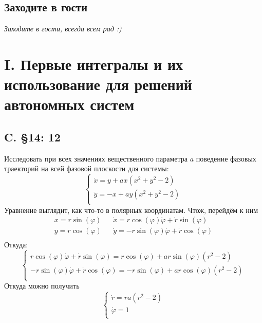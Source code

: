 \documentclass{article}
\begin{document}
\subsection{Заходите в гости}
 \textcolor[rgb]{0.480469,0.566406,0.480469}{\textit{Заходите в гости, всегда всем рад :)}}                                                                                              

\section{I. Первые интегралы и их использование для решений автономных систем}
\subsection{C. \S14: 12}
Исследовать при всех значениях вещественного параметра $a$ поведение фазовых траекторий на всей фазовой плоскости для системы:
\begin{equation}
    \begin{cases}
       \dot{x} = y + ax(x^2 + y^2 - 2)\\
        \dot{y} = - x + ay(x^2 + y^2 - 2)\\
    \end{cases}
\end{equation}
Уравнение выглядит, как что-то в полярных координатам. Чтож, перейдём к ним 
\begin{align*}
x = r \sin{(\varphi)}&&\dot{x} = r \cos {(\varphi)} \dot{\varphi} + \dot{r} \sin {(\varphi )} \\ 
y = r \cos{(\varphi)}&&\dot{y} = -r \sin {(\varphi)} \dot{\varphi} + \dot{r} \cos {(\varphi )} \\ 
\end{align*}
Откуда:
\begin{equation*}
    \begin{cases}
       r \cos {(\varphi)} \dot{\varphi} + \dot{r} \sin {(\varphi )} = r \cos{(\varphi)} + ar \sin{(\varphi)}(r^2 - 2)\\  
      -r \sin {(\varphi)} \dot{\varphi} + \dot{r} \cos {(\varphi )} = -r \sin{(\varphi)} + ar \cos{(\varphi)}(r^2 - 2)\\
    \end{cases}
\end{equation*}
Откуда можно получить 
\begin{equation*}
\begin{cases}
    \dot{r}=ra(r^2-2)\\
    \dot{\varphi}=1\\
        \end{cases}
\end{equation*}
\end{document}
